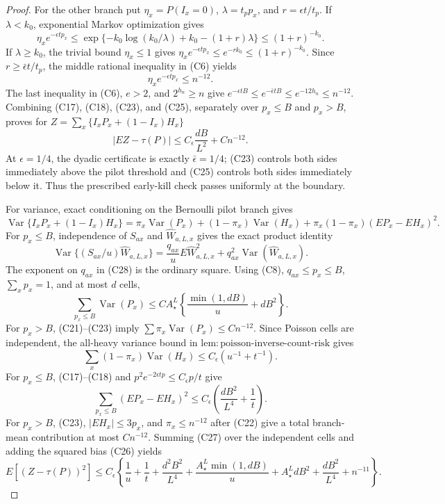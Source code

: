 \documentclass{article}
\begin{document}
\begin{proof}
For the other branch put \(\eta_x=P(I_x=0)\), \(\lambda=t_pp_x\), and \(r=\epsilon t/t_p\).  If \(\lambda<k_0\), exponential Markov optimization gives
\[
 \eta_xe^{-\epsilon tp_x}
 \le\exp\{-k_0\log(k_0/\lambda)+k_0-(1+r)\lambda\}
 \le(1+r)^{-k_0}.                                                    \tag{C24}
\]
If \(\lambda\ge k_0\), the trivial bound \(\eta_x\le1\) gives \(\eta_xe^{-\epsilon tp_x}\le e^{-rk_0}\le(1+r)^{-k_0}\).  Since \(r\ge\bar\epsilon t/t_p\), the middle rational inequality in (C6) yields
\[
 \eta_xe^{-\epsilon tp_x}\le n^{-12}.                             \tag{C25}
\]
The last inequality in (C6), \(e>2\), and \(2^{h_n}\ge n\) give \(e^{-\epsilon tB}\le e^{-\bar\epsilon tB}\le e^{-12h_n}\le n^{-12}\).  Combining (C17), (C18), (C23), and (C25), separately over \(p_x\le B\) and \(p_x>B\), proves for \(Z=\sum_x\{I_xP_x+(1-I_x)H_x\}\)
\[
 |EZ-\tau(P)|\le C_\epsilon\frac{dB}{L^2}+Cn^{-12}.                \tag{C26}
\]
At \(\epsilon=1/4\), the dyadic certificate is exactly \(\bar\epsilon=1/4\); (C23) controls both sides immediately above the pilot threshold and (C25) controls both sides immediately below it.  Thus the prescribed early-kill check passes uniformly at the boundary.

For variance, exact conditioning on the Bernoulli pilot branch gives
\[
 \operatorname{Var}\{I_xP_x+(1-I_x)H_x\}
 =\pi_x\operatorname{Var}(P_x)+(1-\pi_x)\operatorname{Var}(H_x)
 +\pi_x(1-\pi_x)(EP_x-EH_x)^2.                                    \tag{C27}
\]
For \(p_x\le B\), independence of \(S_{ax}\) and \(\widehat W_{a,L,x}\) gives the exact product identity
\[
 \operatorname{Var}\{(S_{ax}/u)\widehat W_{a,L,x}\}
 =\frac{q_{ax}}uE\widehat W_{a,L,x}^{2}
 +q_{ax}^{2}\operatorname{Var}(\widehat W_{a,L,x}).                \tag{C28}
\]
The exponent on \(q_{ax}\) in (C28) is the ordinary square.  Using (C8), \(q_{ax}\le p_x\le B\), \(\sum_xp_x=1\), and at most \(d\) cells,
\[
 \sum_{p_x\le B}\operatorname{Var}(P_x)
 \le C A_\star^L\left\{\frac{\min(1,dB)}u+dB^2\right\}.          \tag{C29}
\]
For \(p_x>B\), (C21)--(C23) imply \(\sum\pi_x\operatorname{Var}(P_x)\le Cn^{-12}\).  Since Poisson cells are independent, the all-heavy variance bound in \(\mathrm{lem:poisson\mbox{-}inverse\mbox{-}count\mbox{-}risk}\) gives
\[
 \sum_x(1-\pi_x)\operatorname{Var}(H_x)
 \le C_\epsilon(u^{-1}+t^{-1}).                                   \tag{C30}
\]
For \(p_x\le B\), (C17)--(C18) and \(p^2e^{-2\epsilon tp}\le C_\epsilon p/t\) give
\[
 \sum_{p_x\le B}(EP_x-EH_x)^2
 \le C_\epsilon\left(\frac{dB^2}{L^4}+\frac1t\right).             \tag{C31}
\]
For \(p_x>B\), (C23), \(|EH_x|\le3p_x\), and \(\pi_x\le n^{-12}\) after (C22) give a total branch-mean contribution at most \(Cn^{-12}\).  Summing (C27) over the independent cells and adding the squared bias (C26) yields
\[
 E[(Z-\tau(P))^2]\le C_\epsilon\left\{
 \frac1u+\frac1t+\frac{d^2B^2}{L^4}
 +\frac{A_\star^L\min(1,dB)}u+A_\star^LdB^2
 +\frac{dB^2}{L^4}+n^{-11}\right\}.                               \tag{C32}
\]


\end{proof}
\end{document}
